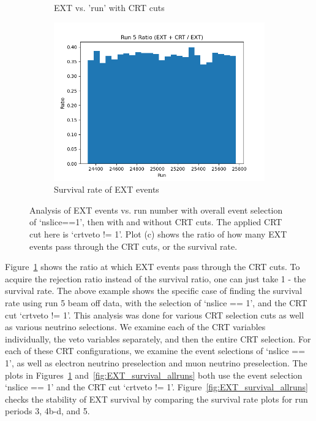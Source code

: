 \begin{figure}[H]
\begin{subfigure}[t]{0.31\linewidth}
        \caption{EXT vs. 'run' with CRT cuts}
    \end{subfigure}%
    \hspace{0.3cm}%
    \begin{subfigure}[t]{0.32\linewidth}
        \includegraphics[width=\linewidth]{technote/EventSelections/FiguresCRT/run5fortalk.png}%
        \caption{Survival rate of EXT events}
    \end{subfigure}
    \caption{Analysis of EXT events vs. run number with overall event selection of `nslice==1', then with and without CRT cuts. The applied CRT cut here is `crtveto != 1'. Plot (c) shows the ratio of how many EXT events pass through the CRT cuts, or the survival rate. }
    \label{fig:EXT_survival_run5}
\end{figure}

Figure~\ref{fig:EXT_survival_run5} shows the ratio at which EXT events pass through the CRT cuts. To acquire the rejection ratio instead of the survival ratio, one can just take 1 - the survival rate. The above example shows the specific case of finding the survival rate using run 5 beam off data, with the selection of `nslice == 1', and the CRT cut `crtveto != 1'. 
This analysis was done for various CRT selection cuts as well as various neutrino selections. We examine each of the CRT variables individually, the veto variables separately, and then the entire CRT selection. For each of these CRT configurations, we examine the event selections of `nslice == 1', as well as electron neutrino preselection and muon neutrino preselection. The plots in Figures~\ref{fig:EXT_survival_run5} and~\ref{fig:EXT_survival_allruns} both use  the event selection `nslice == 1' and the CRT cut `crtveto != 1'. 
Figure~\ref{fig:EXT_survival_allruns} checks the stability of EXT survival by comparing the survival rate plots for run periods 3, 4b-d, and 5.


